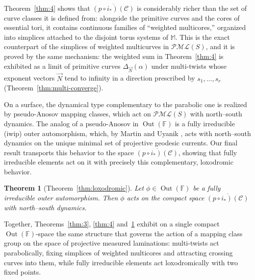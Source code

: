 \documentclass[12pt,a4paper]{amsart}
\numberwithin{equation}{section}
\DeclareMathOperator{\Out}{Out}
\newcommand{\FF}{\mathbb{F}}
\newcommand{\MM}{\mathbb{M}}
\theoremstyle{plain}
\newtheorem{theorem}{Theorem}[section]
\theoremstyle{definition}
\theoremstyle{remark}
\begin{document}
Theorem~\ref{thm:4} shows that $\overline{(p \circ i_*)(\mathcal{C})}$ is considerably richer than the set of curve classes it is defined from: alongside the primitive curves and the cores of essential tori, it contains continuous families of ``weighted multicores,'' organized into simplices attached to the disjoint torus systems of $\MM$.
This is the exact counterpart of the simplices of weighted multicurves in $\mathcal{PML}(S)$, and it is proved by the same mechanism: the weighted sum in Theorem~\ref{thm:4} is exhibited as a limit of primitive curves $\Delta_{\vec{N}}(\alpha)$ under multi-twists whose exponent vectors $\vec{N}$ tend to infinity in a direction prescribed by $s_1, \dots, s_r$ (Theorem~\ref{thm:multi-converge}).

On a surface, the dynamical type complementary to the parabolic one is realized by pseudo-Anosov mapping classes, which act on $\mathcal{PML}(S)$ with north--south dynamics.
The analog of a pseudo-Anosov in $\Out(\FF)$ is a fully irreducible (iwip) outer automorphism, which, by Martin \cite{MR2693216} and Uyanik \cite{MR3273532, MR3370027}, acts with north--south dynamics on the unique minimal set of projective geodesic currents.
Our final result transports this behavior to the space $\overline{(p \circ i_*)(\mathcal{C})}$, showing that fully irreducible elements act on it with precisely this complementary, loxodromic behavior.

\begin{theorem}[Theorem~\ref{thm:loxodromic}]\label{thm:loxodromic-intro}
    Let $\phi \in \Out(\FF)$ be a fully irreducible outer automorphism.
    Then $\phi$ acts on the compact space $\overline{(p \circ i_*)(\mathcal{C})}$ with north--south dynamics.
\end{theorem}

Together, Theorems~\ref{thm:3}, \ref{thm:4} and~\ref{thm:loxodromic-intro} exhibit on a single compact $\Out(\FF)$-space the same structure that governs the action of a mapping class group on the space of projective measured laminations: multi-twists act parabolically, fixing simplices of weighted multicores and attracting crossing curves into them, while fully irreducible elements act loxodromically with two fixed points.
\end{document}
